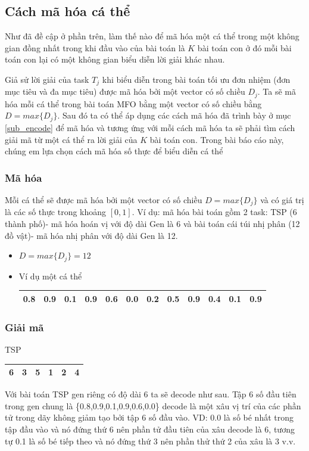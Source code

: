 \documentclass[a4paper,12pt]{report}
\begin{document}
\subsection{Cách mã hóa cá thể}
Như đã đề cập ở phần trên, làm thế nào để mã hóa một cá thể trong một không gian đồng nhất trong khi đầu vào của bài toán là $K$ bài toán con ở đó mỗi bài toán con lại có một không gian biểu diễn lời giải khác nhau.
\par Giả sử lời giải của task $T_j$ khi biểu diễn trong bài toán tối ưu đơn nhiệm (đơn mục tiêu và đa mục tiêu) được mã hóa bởi một vector có số chiều $D_j$. Ta sẽ mã hóa mỗi cá thể trong bài toán MFO bằng một vector có số chiều bằng $D = max\{D_j\}$. Sau đó ta có thể áp dụng các cách mã hóa đã trình bày ở mục \ref{sub_encode}  để mã hóa và tương ứng với mỗi cách mã hóa ta sẽ phải tìm cách giải mã từ một cá thể ra lời giải của $K$ bài toán con. Trong bài báo cáo này, chúng em lựa chọn cách mã hóa số thực để biểu diễn cá thể
\subsubsection{Mã hóa}
Mỗi cá thể sẽ được mã hóa bởi một vector có số chiều $D = max\{D_j\}$ và có giá trị là các số thực trong khoảng $[0,1]$. Ví dụ: mã hóa bài toán gồm 2 task: TSP (6 thành phố)- mã hóa hoán vị với độ dài Gen là 6 và bài toán cái túi nhị phân (12 đồ vật)- mã hóa nhị phân với độ dài Gen là 12.
\begin{itemize}
\item $D = max\{D_j\} = 12$
\item Ví dụ một cá thể 
\begin{longtable}{|c|c|c|c|c|c|c|c|c|c|c|c|}
\hline
0.8 & 0.9 & 0.1 & 0.9 & 0.6 & 0.0 & 0.2 & 0.5 & 0.9 & 0.4 & 0.1 & 0.9\\
\hline
\end{longtable}\end{itemize}

\subsubsection{Giải mã}
TSP
\begin{longtable}{|c|c|c|c|c|c|}
\hline
6& 3& 5& 1& 2& 4\\
\hline
\end{longtable}
Với bài toán TSP gen riêng có độ dài 6 ta sẽ decode như sau. Tập 6 số đầu tiên trong gen chung là \{0.8,0.9,0.1,0.9,0.6,0.0\} decode là một xâu vị trí của các phần tử trong dãy không giảm tạo bởi tập 6 số đầu vào. VD: 0.0 là số bé nhất trong tập đầu vào và nó đứng thứ 6 nên phần tử đầu tiên của xâu decode là 6, tương tự 0.1 là số bé tiếp theo và nó đứng thứ 3 nên phần thử thứ 2 của xâu là 3 v.v.
\end{document}
